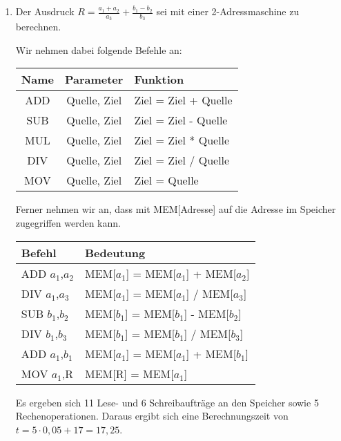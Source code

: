 \documentclass[ngerman]{fbi-aufgabenblatt}
\begin{document}
\begin{enumerate}
	\item Der Ausdruck $R = \frac{a_{1} + a_{2}}{a_{3}} + \frac{b_{1} - b_{2}}{b_{3}}$ sei mit einer 2-Adressmaschine zu berechnen.
	
	Wir nehmen dabei folgende Befehle an:\\
	\begin{tabular}{c|c|l}
	   Name & Parameter 	& Funktion \\\hline
	   ADD	& Quelle, Ziel	& Ziel = Ziel + Quelle \\\hline
	   SUB	& Quelle, Ziel	& Ziel = Ziel - Quelle \\\hline
	   MUL	& Quelle, Ziel	& Ziel = Ziel * Quelle \\\hline
	   DIV	& Quelle, Ziel	& Ziel = Ziel / Quelle \\\hline
	   MOV	& Quelle, Ziel	& Ziel = Quelle
	\end{tabular}
	 
	Ferner nehmen wir an, dass mit MEM[Adresse] auf die Adresse im Speicher zugegriffen werden kann.
	
	\begin{tabular}{l|l}
		Befehl & Bedeutung \\
		\hline
	    ADD $a_{1}$,$a_{2}$ & MEM[$a_{1}$] = MEM[$a_{1}$] + MEM[$a_{2}$] \\
	    DIV $a_{1}$,$a_{3}$ & MEM[$a_{1}$] = MEM[$a_{1}$] / MEM[$a_{3}$] \\
	    SUB $b_{1}$,$b_{2}$ & MEM[$b_{1}$] = MEM[$b_{1}$] - MEM[$b_{2}$] \\
	    DIV $b_{1}$,$b_{3}$ & MEM[$b_{1}$] = MEM[$b_{1}$] / MEM[$b_{3}$] \\
	    ADD $a_{1}$,$b_{1}$ & MEM[$a_{1}$] = MEM[$a_{1}$] + MEM[$b_{1}$] \\
	    MOV $a_{1}$,R & MEM[R] = MEM[$a_{1}$]
	\end{tabular}
	
	Es ergeben sich 11 Lese- und 6 Schreibaufträge an den Speicher sowie 5 Rechenoperationen. Daraus ergibt sich eine Berechnungszeit von $t = 5\cdot 0,05 + 17 = 17,25$.
\end{enumerate}
\end{document}
